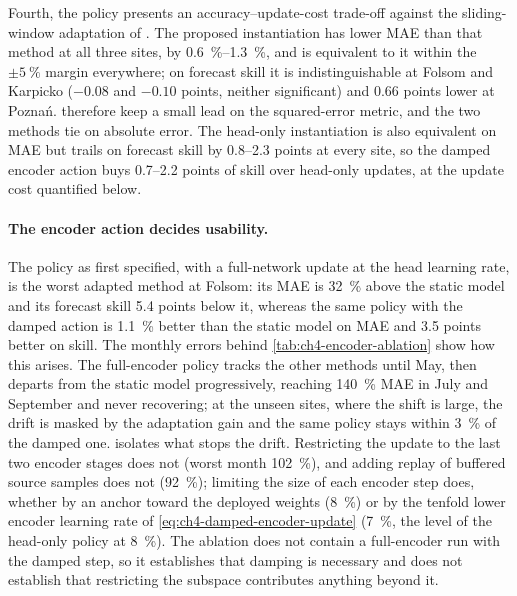 Fourth, the policy presents an accuracy--update-cost trade-off against the sliding-window adaptation of \citet{LARABENITEZ2023126312}. The proposed instantiation has lower MAE than that method at all three sites, by \SIrange{0.6}{1.3}{\percent}, and is equivalent to it within the $\pm\SI{5}{\percent}$ margin everywhere; on forecast skill it is indistinguishable at Folsom and Karpicko ($-0.08$ and $-0.10$ points, neither significant) and \num{0.66} points lower at Poznań. \citet{LARABENITEZ2023126312} therefore keep a small lead on the squared-error metric, and the two methods tie on absolute error. The head-only instantiation is also equivalent on MAE but trails on forecast skill by \numrange{0.8}{2.3} points at every site, so the damped encoder action buys \numrange{0.7}{2.2} points of skill over head-only updates, at the update cost quantified below.

\paragraph{The encoder action decides usability.} The policy as first specified, with a full-network update at the head learning rate, is the worst adapted method at Folsom: its MAE is \SI{32}{\percent} above the static model and its forecast skill \num{5.4} points below it, whereas the same policy with the damped action is \SI{1.1}{\percent} better than the static model on MAE and \num{3.5} points better on skill. The monthly errors behind \cref{tab:ch4-encoder-ablation} show how this arises. The full-encoder policy tracks the other methods until May, then departs from the static model progressively, reaching \SI{+140}{\percent} MAE in July and September and never recovering; at the unseen sites, where the shift is large, the drift is masked by the adaptation gain and the same policy stays within \SI{3}{\percent} of the damped one.  isolates what stops the drift. Restricting the update to the last two encoder stages does not (worst month \SI{+102}{\percent}), and adding replay of buffered source samples does not (\SI{+92}{\percent}); limiting the size of each encoder step does, whether by an anchor toward the deployed weights (\SI{+8}{\percent}) or by the tenfold lower encoder learning rate of \cref{eq:ch4-damped-encoder-update} (\SI{+7}{\percent}, the level of the head-only policy at \SI{+8}{\percent}). The ablation does not contain a full-encoder run with the damped step, so it establishes that damping is necessary and does not establish that restricting the subspace contributes anything beyond it.

